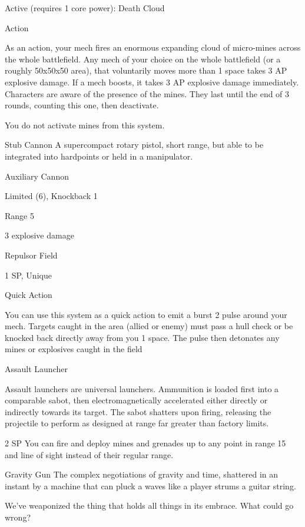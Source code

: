  Active (requires 1 core power): Death Cloud
 
 Action
 
 As an action, your mech fires an enormous expanding cloud of micro-mines across the whole  
 battlefield. Any mech of your choice on the whole battlefield (or a roughly 50x50x50 area), that  
 voluntarily moves more than 1 space takes 3 AP explosive damage. If a mech boosts, it takes 3 AP  
 explosive damage immediately. Characters are aware of the presence of the mines. They last until the  
 end of 3 rounds, counting this one, then deactivate.
 
 You do not activate mines from this system. 

Stub Cannon  
A supercompact rotary pistol, short range, but able to be integrated into hardpoints or held in a  
manipulator.  

Auxiliary Cannon
 
Limited (6), Knockback 1
 
Range 5
 
3 explosive damage  

Repulsor Field
 

1 SP, Unique
 

Quick Action
 
You can use this system as a quick action to emit a burst 2 pulse around your mech. Targets  
caught in the area (allied or enemy) must pass a hull check or be knocked back directly away  
from you 1 space. The pulse then detonates any mines or explosives caught in the field
 

Assault Launcher  

Assault launchers are universal launchers. Ammunition is loaded first into a comparable sabot, then  
electromagnetically accelerated either directly or indirectly towards its target. The sabot shatters upon  
firing, releasing the projectile to perform as designed at range far greater than factory limits.   

2 SP  
You can fire and deploy mines and grenades up to any point in range 15 and line of sight instead  
of their regular range. 
 

                                                                                                               


Gravity Gun  
The complex negotiations of gravity and time, shattered in an instant by a machine that can pluck  
a waves like a player strums a guitar string.   

We’ve weaponized the thing that holds all things in its embrace. What could go wrong?  

